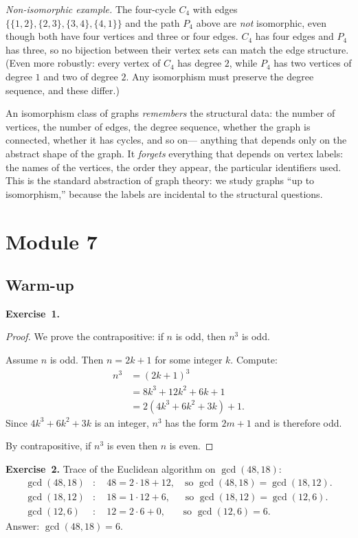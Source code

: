 \documentclass[11pt]{article}
\begin{document}
\emph{Non-isomorphic example.}  The four-cycle $C_4$ with edges
$\{\{1,2\}, \{2,3\}, \{3,4\}, \{4,1\}\}$ and the path $P_4$ above are
\emph{not} isomorphic, even though both have four vertices and three or
four edges.  $C_4$ has four edges and $P_4$ has three, so no bijection
between their vertex sets can match the edge structure.  (Even more
robustly: every vertex of $C_4$ has degree $2$, while $P_4$ has two
vertices of degree $1$ and two of degree $2$.  Any isomorphism must
preserve the degree sequence, and these differ.)

An isomorphism class of graphs \emph{remembers} the structural data:
the number of vertices, the number of edges, the degree sequence,
whether the graph is connected, whether it has cycles, and so on---
anything that depends only on the abstract shape of the graph.  It
\emph{forgets} everything that depends on vertex labels: the names of
the vertices, the order they appear, the particular identifiers used.
This is the standard abstraction of graph theory: we study graphs
``up to isomorphism,'' because the labels are incidental to the
structural questions.

\section*{Module 7}

\subsection*{Warm-up}

\textbf{Exercise~1.}
\begin{proof}
We prove the contrapositive: if $n$ is odd, then $n^3$ is odd.

Assume $n$ is odd. Then $n = 2k + 1$ for some integer $k$. Compute:
\begin{align*}
  n^3 &= (2k+1)^3 \\
      &= 8k^3 + 12k^2 + 6k + 1 \\
      &= 2(4k^3 + 6k^2 + 3k) + 1.
\end{align*}
Since $4k^3 + 6k^2 + 3k$ is an integer, $n^3$ has the form $2m + 1$ and is
therefore odd.

By contrapositive, if $n^3$ is even then $n$ is even.
\end{proof}

\medskip
\textbf{Exercise~2.}
Trace of the Euclidean algorithm on $\gcd(48, 18)$:
\begin{align*}
  \gcd(48, 18) &: \quad 48 = 2 \cdot 18 + 12, \quad \text{so } \gcd(48,18) = \gcd(18,12). \\
  \gcd(18, 12) &: \quad 18 = 1 \cdot 12 + 6, \quad\;\; \text{so } \gcd(18,12) = \gcd(12,6). \\
  \gcd(12, 6)  &: \quad 12 = 2 \cdot 6 + 0, \quad\;\;\; \text{so } \gcd(12,6) = 6.
\end{align*}
Answer: $\gcd(48, 18) = 6$.
\end{document}
